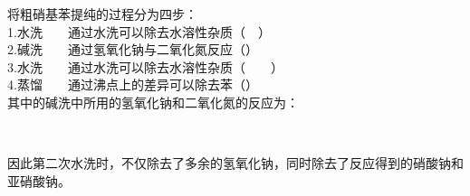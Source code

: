\documentclass[UTF8]{ctexart}
\begin{document}
    将粗硝基苯提纯的过程分为四步：\\[3mm]
    1.水洗~~~~通过水洗可以除去水溶性杂质（~~）\\[3mm]
    2.碱洗~~~~通过氢氧化钠与二氧化氮反应（）\\[3mm]
    3.水洗~~~~通过水洗可以除去水溶性杂质（~~~~）\\[3mm]
    4.蒸馏~~~~通过沸点上的差异可以除去苯（）\\[6mm]
    其中的碱洗中所用的氢氧化钠和二氧化氮的反应为：
    \begin{center}
        \\[3mm]
    \end{center}
    因此第二次水洗时，不仅除去了多余的氢氧化钠，同时除去了反应得到的硝酸钠和亚硝酸钠。

\newpage
\end{document}
